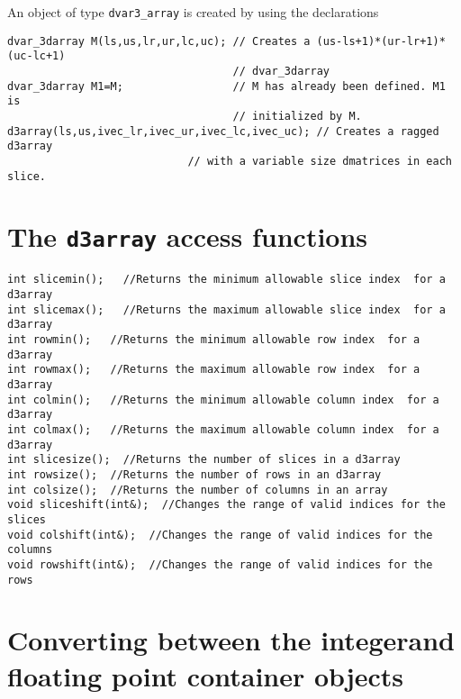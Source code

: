 \documentclass{admbmanual}
\begin{document}
An object of type \texttt{dvar3\_array} is created by using the declarations
\begin{lstlisting}
dvar_3darray M(ls,us,lr,ur,lc,uc); // Creates a (us-ls+1)*(ur-lr+1)*(uc-lc+1) 
                                   // dvar_3darray
dvar_3darray M1=M;                 // M has already been defined. M1 is 
                                   // initialized by M.
d3array(ls,us,ivec_lr,ivec_ur,ivec_lc,ivec_uc); // Creates a ragged d3array 
                            // with a variable size dmatrices in each slice.
\end{lstlisting}


\section{The \texttt{d3array} access functions}

\begin{lstlisting}
int slicemin();   //Returns the minimum allowable slice index  for a d3array
int slicemax();   //Returns the maximum allowable slice index  for a d3array
int rowmin();   //Returns the minimum allowable row index  for a d3array
int rowmax();   //Returns the maximum allowable row index  for a d3array
int colmin();   //Returns the minimum allowable column index  for a d3array
int colmax();   //Returns the maximum allowable column index  for a d3array
int slicesize();  //Returns the number of slices in a d3array
int rowsize();  //Returns the number of rows in an d3array
int colsize();  //Returns the number of columns in an array
void sliceshift(int&);  //Changes the range of valid indices for the slices 
void colshift(int&);  //Changes the range of valid indices for the columns
void rowshift(int&);  //Changes the range of valid indices for the rows 
\end{lstlisting}


\section{Converting between the integer\br and floating point container objects}
\end{document}
